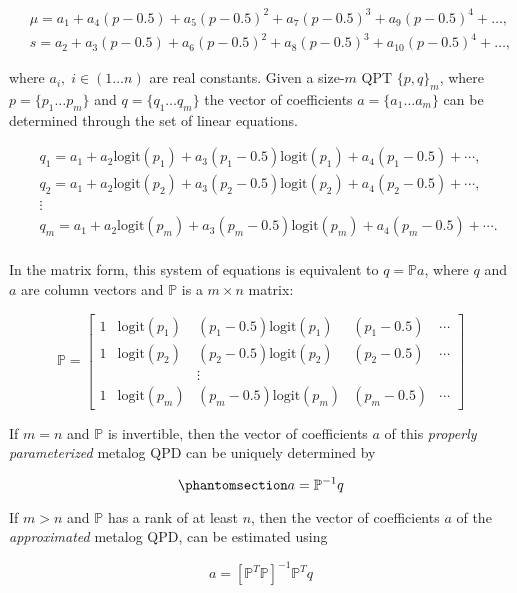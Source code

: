 \documentclass[
  letterpaper,
  DIV=11,
  numbers=noendperiod]{scrartcl}
\begin{document}
\[
\begin{aligned}\;
&\mu=a_1+a_4(p-0.5)+a_5(p-0.5)^2+a_7(p-0.5)^3+a_9(p-0.5)^4+\dots, \\
& s=a_2+a_3(p-0.5)+a_6(p-0.5)^2+a_8(p-0.5)^3+a_{10}(p-0.5)^4+\dots,
\end{aligned}
\]

where \(a_i, \; i \in (1\dots n)\) are real constants. Given a
size-\(m\) QPT \(\{p, q\}_m\), where \(p=\{p_1\dots p_m\}\) and
\(q=\{q_1\dots q_m\}\) the vector of coefficients \(a=\{a_1\dots a_m\}\)
can be determined through the set of linear equations.

\[
\begin{aligned}\;
&q_1=a_1+a_2\text{logit}(p_1)+a_3(p_1-0.5)\text{logit}(p_1)+a_4(p_1-0.5)+\cdots,\\
&q_2=a_1+a_2\text{logit}(p_2)+a_3(p_2-0.5)\text{logit}(p_2)+a_4(p_2-0.5)+\cdots,\\
&\vdots\\
&q_m=a_1+a_2\text{logit}(p_m)+a_3(p_m-0.5)\text{logit}(p_m)+a_4(p_m-0.5)+\cdots.\\
\end{aligned}
\]

In the matrix form, this system of equations is equivalent to
\(q=\mathbb{P}a\), where \(q\) and \(a\) are column vectors and
\(\mathbb{P}\) is a \(m \times n\) matrix:

\[
\mathbb{P} = \left[\begin{array}{lllll}
1  &\text{logit}(p_1) &(p_1-0.5)\text{logit}(p_1) &(p_1-0.5) &\cdots\\
1  &\text{logit}(p_2) &(p_2-0.5)\text{logit}(p_2) &(p_2-0.5) &\cdots\\
   &                  &\vdots\\
1  &\text{logit}(p_m) &(p_m-0.5)\text{logit}(p_m) &(p_m-0.5) &\cdots
\end{array}\right]
\]

If \(m=n\) and \(\mathbb{P}\) is invertible, then the vector of
coefficients \(a\) of this \emph{properly parameterized} metalog QPD can
be uniquely determined by

\begin{equation}\phantomsection\label{eq-nmetalogAsMatrixeq}{
a=\mathbb{P}^{-1}q
}\end{equation}

If \(m > n\) and \(\mathbb{P}\) has a rank of at least \(n\), then the
vector of coefficients \(a\) of the \emph{approximated} metalog QPD, can
be estimated using

\[
a=[\mathbb{P}^T\mathbb{P}]^{-1}\mathbb{P}^Tq
\]
\end{document}
